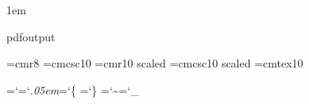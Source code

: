 

									
\def\title{} %

\let\maybe=\iftrue %

\parskip 0pt

\parindent 1em  %

\newif\ifpdf
\expandafter\ifx\csname pdfoutput\endcsname\relax \else\pdftrue\fi

\def\cmylink{0 1 0} %


\font\eightrm=cmr8
\font\sc=cmcsc10
\let\mainfont=\tenrm
\font\fourteenrm=cmr10 scaled    \let\titlefont\fourteenrm
\font\fourteensc=cmcsc10 scaled 
\font\tentex=cmtex10 %
\let\idfont\it
\let\reservedfont\bf

\def\\#1{\leavevmode\hbox{\idfont#1\/\kern.05em}} %
\def\|#1{\leavevmode\hbox{$#1$}} %
\def\&#1{\leavevmode\hbox{\reservedfont#1\/}} %
\def\.#1{\leavevmode\hbox{\tentex %
  \let\\=\BS %
  \let\'=\RQ %
  \let\`=\LQ %
  \let\~=\TL %
  \let\ =\SP %
  \let\_=\UL %
  \let\&=\AM %
  #1}}


\let\amp=\&
\let\SS=\S
\let\PP=\P

\let\Y\smallskip

\def\#{\hbox{\tt\char`\#}} %
\def\${\hbox{\tt\char`\$}} %
\def\%{\hbox{\tt\char`\%}} %
\def\^{\ifmmode\mathchar"222 \else\char`^ \fi} %
\def\AT!{@} %
\def\@{@} %

\chardef\AM=`\& %
\chardef\BS=`\\ %
\chardef\LB=`\{ %
\def\LQ{{\tt\char'22}} %
\chardef\RB=`\} %
\def\RQ{{\tt\char'23}} %
\def\SP{{\tt\char`\ }} %
\chardef\TL=`\~ %
\chardef\UL=`\_ %

